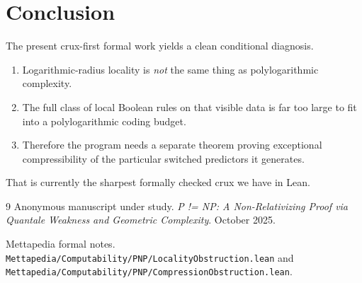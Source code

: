 \documentclass[11pt]{article}
\theoremstyle{remark}
\begin{document}
\section{Conclusion}

The present crux-first formal work yields a clean conditional diagnosis.

\begin{enumerate}[leftmargin=1.5em]
  \item Logarithmic-radius locality is \emph{not} the same thing as polylogarithmic complexity.
  \item The full class of local Boolean rules on that visible data is far too large to fit into a
  polylogarithmic coding budget.
  \item Therefore the program needs a separate theorem proving exceptional compressibility
  of the particular switched predictors it generates.
\end{enumerate}

That is currently the sharpest formally checked crux we have in Lean.

\begin{thebibliography}{9}
Anonymous manuscript under study.
\newblock \emph{P != NP: A Non-Relativizing Proof via Quantale Weakness and Geometric Complexity}.
\newblock October 2025.

Mettapedia formal notes.
\newblock \texttt{Mettapedia/Computability/PNP/LocalityObstruction.lean} and
\texttt{Mettapedia/Computability/PNP/CompressionObstruction.lean}.
\end{thebibliography}
\end{document}

